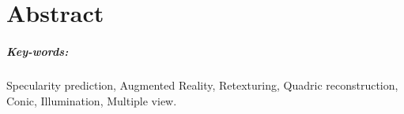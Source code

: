 \chapter*{Abstract}


\paragraph{Key-words:} Specularity prediction, Augmented Reality, Retexturing, Quadric reconstruction, Conic, Illumination, Multiple view.

